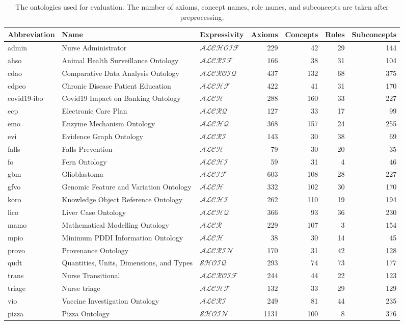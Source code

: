 \documentclass[
]{ceurart}
\begin{document}
\begin{table}
  \centering
  \scriptsize
  \begin{tabular}{|lllrrrr|}
    \hline
    Abbreviation & Name & Expressivity & Axioms & Concepts & Roles & Subconcepts \\
    \hline
    admin & Nurse Administrator & $\mathcal{ALCHOIF}$ & 229 & 42 & 29 & 144 \\
    ahso & Animal Health Surveillance Ontology & $\mathcal{ALCRIF}$ & 166 & 38 & 31 & 104 \\
    cdao & Comparative Data Analysis Ontology & $\mathcal{ALCROIQ}$ & 437 & 132 & 68 & 375 \\
    cdpeo & Chronic Disease Patient Education & $\mathcal{ALCHF}$ & 422 & 41 & 31 & 170 \\
    covid19-ibo & Covid19 Impact on Banking Ontology & $\mathcal{ALCH}$ & 288 & 160 & 33 & 227 \\
    ecp & Electronic Care Plan & $\mathcal{ALCRQ}$ & 127 & 33 & 17 & 99 \\
    emo & Enzyme Mechanism Ontology & $\mathcal{ALCHQ}$ & 368 & 157 & 24 & 255 \\
    evi & Evidence Graph Ontology & $\mathcal{ALCRI}$ & 143 & 30 & 38 & 69 \\
    falls & Falls Prevention & $\mathcal{ALCH}$ & 79 & 30 & 20 & 35 \\
    fo & Fern Ontology & $\mathcal{ALCHI}$ & 59 & 31 & 4 & 46 \\
    gbm & Glioblastoma & $\mathcal{ALCIF}$ & 603 & 108 & 28 & 227 \\
    gfvo & Genomic Feature and Variation Ontology & $\mathcal{ALCH}$ & 332 & 102 & 30 & 170 \\
    koro & Knowledge Object Reference Ontology & $\mathcal{ALCHI}$ & 262 & 110 & 19 & 194 \\
    lico & Liver Case Ontology & $\mathcal{ALCHQ}$ & 366 & 93 & 36 & 230 \\
    mamo & Mathematical Modelling Ontology & $\mathcal{ALCR}$ & 229 & 107 & 3 & 154 \\
    mpio & Minimum PDDI Information Ontology & $\mathcal{ALCH}$ & 38 & 30 & 14 & 45 \\
    provo & Provenance Ontology & $\mathcal{ALCRIN}$ & 170 & 31 & 42 & 128 \\
    qudt & Quantities, Units, Dimensions, and Types & $\mathcal{SHOIQ}$ & 293 & 74 & 73 & 177 \\
    trans & Nurse Transitional & $\mathcal{ALCROIF}$ & 244 & 44 & 22 & 123 \\
    triage & Nurse triage & $\mathcal{ALCHF}$ & 132 & 33 & 29 & 129 \\
    vio & Vaccine Investigation Ontology & $\mathcal{ALCRI}$ & 249 & 81 & 44 & 235 \\
    pizza & Pizza Ontology & $\mathcal{SHOIN}$ & 1131 & 100 & 8 & 376 \\
    \hline
  \end{tabular}
  \caption{The ontologies used for evaluation. The number of axioms, concept names, role names, and subconcepts are taken after preprocessing.}
	\label{table:ontologies}
\end{table}
\end{document}
